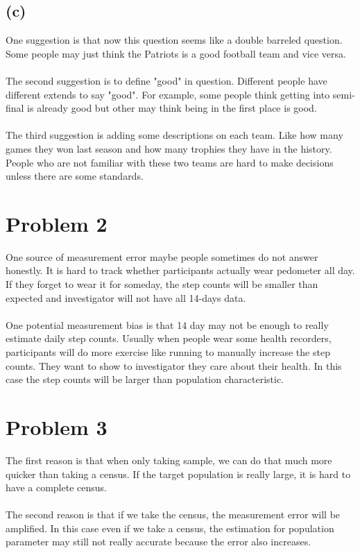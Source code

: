 \documentclass{article}
\begin{document}
\subsection*{(c)}
One suggestion is that now this question seems like a double barreled question. Some people may just think the Patriots is a good football team and vice versa.\\
\\
The second suggestion is to define "good" in question. Different people have different extends to say "good". For example, some people think getting into semi-final is already good but other may think being in the first place is good.\\
\\
The third suggestion is adding some descriptions on each team. Like how many games they won last season and how many trophies they have in the history. People who are not familiar with these two teams are hard to make decisions unless there are some standards.\\



\section*{Problem 2}

One source of measurement error maybe people sometimes do not answer honestly. 
It is hard to track whether participants actually wear pedometer all day. 
If they forget to wear it for someday, the step counts will be smaller than expected and investigator will not have all 14-days data.\\
\\
One potential measurement bias is that 14 day may not be enough to really estimate daily step counts.
Usually when people wear some health recorders, participants will do more exercise like running to manually increase the step counts. 
They want to show to investigator they care about their health. In this case the step counts will be larger than population characteristic.




\section*{Problem 3}
The first reason is that when only taking sample, we can do that much more quicker than taking a census.
If the target population is really large, it is hard to have a complete census.\\
\\
The second reason is that if we take the census, the measurement error will be amplified.
In this case even if we take a census, the estimation for population parameter may still not really accurate because the error also increases.
\end{document}
